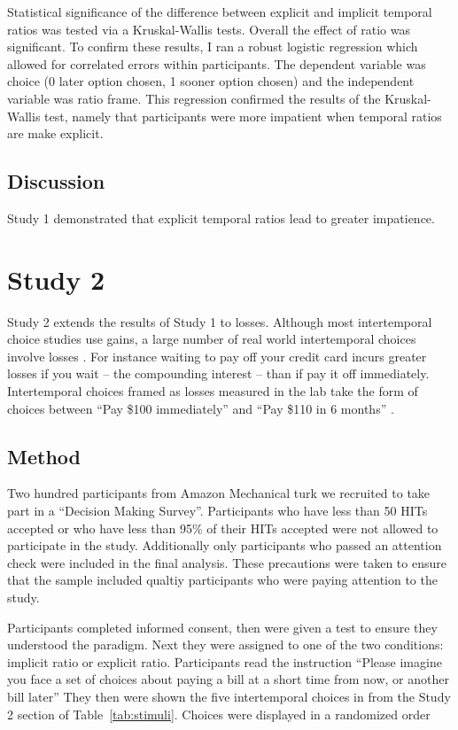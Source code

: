 \documentclass[]{article}
\begin{document}
Statistical significance of  the difference between explicit and implicit temporal ratios was tested via a Kruskal-Wallis tests.
 Overall the effect of ratio was significant. 
 To confirm these results, I ran a robust logistic regression which allowed for correlated errors within participants.
 The dependent variable was choice (0 later option chosen, 1 sooner option chosen) and the independent variable was ratio frame. 
 This regression confirmed the results of the Kruskal-Wallis test, namely that participants were more impatient when temporal ratios are make explicit. 
 
\subsection{Discussion}

Study 1 demonstrated that explicit temporal ratios lead to greater impatience. 

\section{Study 2}

Study 2 extends the results of Study 1 to losses. 
Although most intertemporal choice studies use gains, a large number of real world intertemporal choices involve losses \cite{Hardisty2013}. 
For instance waiting to pay off your credit card incurs greater losses if you wait -- the compounding interest -- than if pay it off immediately.
Intertemporal choices framed as losses measured in the lab take the form of choices between ``Pay \$100 immediately'' and  ``Pay \$110 in 6 months'' \cite{Hardisty2015}.

\subsection{Method}
Two hundred participants from Amazon Mechanical turk we recruited to take part in a ``Decision Making Survey''. 
Participants who have less than 50 HITs accepted or  who have less than 95\% of their HITs accepted were not allowed to participate in the study. 
Additionally only participants who passed an attention check were included in the final analysis.
These precautions were taken to ensure that the sample included qualtiy participants who were paying attention to the study. 

Participants completed informed consent, then were given a test to ensure they understood the paradigm.
Next they were assigned to one of the two conditions: implicit ratio or explicit ratio. 
Participants read the instruction
``Please imagine you face a set of choices
about paying a bill at a short time from now, or another bill later''
They then were shown the five intertemporal choices in from the Study 2 section of  Table~\ref{tab:stimuli}. 
Choices were displayed in a randomized order
\end{document}

